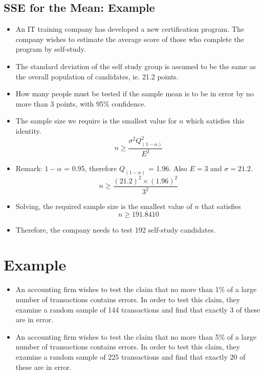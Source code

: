 \documentclass[]{report}
\begin{document}


\subsection{SSE for the Mean: Example}

\begin{itemize}
\item An IT training company has developed a new certification program. The company wishes to estimate the average score of those who complete the program by self-study.  \item The standard deviation of the self study group is assumed to be the same as the overall population of candidates, ie. 21.2 points.
\item How many people must be tested if the sample mean is to be in error by no more than 3 points, with 95\% confidence.
\end{itemize}





\begin{itemize}
\item The sample size we require is the smallest value for $n$ which satisfies this identity.
\[ n \geq \frac{\sigma^2 Q^2_{(1-\alpha)}}{E^2}  \]
\item Remark: $1-\alpha$ = 0.95, therefore $Q_{(1-\alpha)}$ = 1.96. Also $E=3$ and $\sigma =21.2$.
\[ n \geq \frac{(21.2)^2 \times (1.96)^2}{3^2} \]
\item Solving, the required sample size is the smallest value of $n$ that satisfies
\[ n \geq 191.8410 \]
\item Therefore, the company needs to test 192 self-study candidates.
\end{itemize}





\section{Example}
\begin{itemize}
\item An accounting firm wishes to test the claim that no more than 1\% of a large
number of transactions contains errors. In order to test this claim, they
examine a random sample of 144 transactions and find that exactly 3 of
these are in error.

\item An accounting firm wishes to test the claim that no more than 5\% of a large
number of transactions contains errors. In order to test this claim, they examine a
random sample of 225 transactions and find that exactly 20 of these are in error.
\end{itemize}
\end{document}
